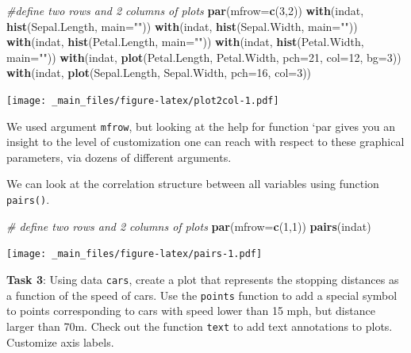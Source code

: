 \documentclass[]{book}
\newenvironment{Shaded}{\begin{snugshade}}{\end{snugshade}}
\newcommand{\KeywordTok}[1]{\textcolor[rgb]{0.13,0.29,0.53}{\textbf{#1}}}
\newcommand{\DataTypeTok}[1]{\textcolor[rgb]{0.13,0.29,0.53}{#1}}
\newcommand{\DecValTok}[1]{\textcolor[rgb]{0.00,0.00,0.81}{#1}}
\newcommand{\StringTok}[1]{\textcolor[rgb]{0.31,0.60,0.02}{#1}}
\newcommand{\CommentTok}[1]{\textcolor[rgb]{0.56,0.35,0.01}{\textit{#1}}}
\newcommand{\NormalTok}[1]{#1}
\theoremstyle{definition}
\theoremstyle{definition}
\theoremstyle{remark}
\begin{document}
\begin{Shaded}
\begin{Highlighting}[]
\CommentTok{#define two rows and 2 columns of plots}
\KeywordTok{par}\NormalTok{(}\DataTypeTok{mfrow=}\KeywordTok{c}\NormalTok{(}\DecValTok{3}\NormalTok{,}\DecValTok{2}\NormalTok{))}
\KeywordTok{with}\NormalTok{(indat, }\KeywordTok{hist}\NormalTok{(Sepal.Length, }\DataTypeTok{main=}\StringTok{""}\NormalTok{))}
\KeywordTok{with}\NormalTok{(indat, }\KeywordTok{hist}\NormalTok{(Sepal.Width, }\DataTypeTok{main=}\StringTok{""}\NormalTok{))}
\KeywordTok{with}\NormalTok{(indat, }\KeywordTok{hist}\NormalTok{(Petal.Length, }\DataTypeTok{main=}\StringTok{""}\NormalTok{))}
\KeywordTok{with}\NormalTok{(indat, }\KeywordTok{hist}\NormalTok{(Petal.Width, }\DataTypeTok{main=}\StringTok{""}\NormalTok{))}
\KeywordTok{with}\NormalTok{(indat, }\KeywordTok{plot}\NormalTok{(Petal.Length, Petal.Width, }\DataTypeTok{pch=}\DecValTok{21}\NormalTok{, }\DataTypeTok{col=}\DecValTok{12}\NormalTok{, }\DataTypeTok{bg=}\DecValTok{3}\NormalTok{))}
\KeywordTok{with}\NormalTok{(indat, }\KeywordTok{plot}\NormalTok{(Sepal.Length, Sepal.Width, }\DataTypeTok{pch=}\DecValTok{16}\NormalTok{, }\DataTypeTok{col=}\DecValTok{3}\NormalTok{))}
\end{Highlighting}
\end{Shaded}

\texttt{[image: \_main\_files/figure-latex/plot2col-1.pdf]}

We used argument \texttt{mfrow}, but looking at the help for function
`par gives you an insight to the level of customization one can reach
with respect to these graphical parameters, via dozens of different
arguments.

We can look at the correlation structure between all variables using
function \texttt{pairs()}.

\begin{Shaded}
\begin{Highlighting}[]
\CommentTok{# define two rows and 2 columns of plots}
\KeywordTok{par}\NormalTok{(}\DataTypeTok{mfrow=}\KeywordTok{c}\NormalTok{(}\DecValTok{1}\NormalTok{,}\DecValTok{1}\NormalTok{))}
\KeywordTok{pairs}\NormalTok{(indat)}
\end{Highlighting}
\end{Shaded}

\texttt{[image: \_main\_files/figure-latex/pairs-1.pdf]}

\textbf{Task 3}: Using data \texttt{cars}, create a plot that represents
the stopping distances as a function of the speed of cars. Use the
\texttt{points} function to add a special symbol to points corresponding
to cars with speed lower than 15 mph, but distance larger than 70m.
Check out the function \texttt{text} to add text annotations to plots.
Customize axis labels.
\end{document}
